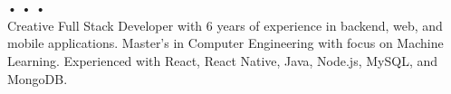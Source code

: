 \hspace*{1cm} \\ \vspace{5pt}
 \\ \vspace{5pt}
\href{tel:+1-872-258-5803}{\small{}}
\hspace{0.43em}•\hspace{0.43em}\href{mailto:an23lm+resumelead@gmail.com}{\small{}}
\hspace{0.43em}•\hspace{0.43em}\href{https://www.linkedin.com/in/anselmj}{\small{}}
\hspace{0.43em}•\hspace{0.43em}\href{https://an23lm.github.io}{\small{}} \\ \vspace{10pt}
\small{Creative Full Stack Developer with 6 years of experience in backend, web, and mobile applications. Master's in Computer Engineering with focus on Machine Learning. Experienced with React, React Native, Java, Node.js, MySQL, and MongoDB.}
